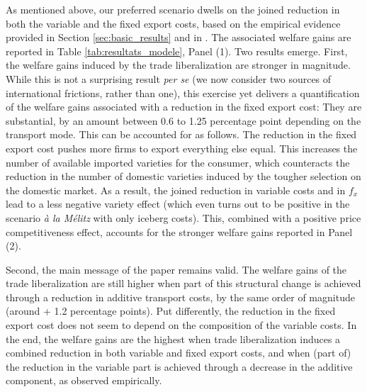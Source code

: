\documentclass[a4paper,11pt]{article}
\begin{document}
As mentioned above, our preferred scenario dwells on the joined reduction in both the variable and the fixed export costs, based on the empirical evidence provided in Section  \ref{sec:basic_results} and in \cite{Lincoln_McCallum2018}. The associated welfare gains are reported in Table \ref{tab:resultats_modele}, Panel (1). Two results emerge. First, the welfare gains induced by the trade liberalization are stronger in magnitude. While this is not a surprising result \textit{per se} (we now consider two sources of international frictions, rather than one), this exercise yet delivers a quantification of the welfare gains associated with a reduction in the fixed export cost: They are substantial, by an amount between 0.6 to 1.25 percentage point depending on the transport mode. This can be accounted for as follows. The reduction in the fixed export cost pushes more firms to export everything else equal. This increases the number of available imported varieties for the consumer, which counteracts the reduction in the number of domestic varieties induced by the tougher selection on the domestic market. As a result, the joined reduction in variable costs and in $f_x$ lead to a less negative variety effect (which even turns out to be positive in the scenario \textit{à la M\'{e}litz} with only iceberg costs). This, combined with a positive price competitiveness effect, accounts for the stronger welfare gains reported in Panel (2).

Second, the main message of the paper remains valid. The welfare gains of the trade liberalization are still higher when part of this structural change is achieved through a reduction in additive transport costs, by the same order of magnitude (around + 1.2 percentage points). Put differently, the reduction in the fixed export cost does not seem to depend on the composition of the variable costs. In the end, the welfare gains are the highest when trade liberalization induces a combined reduction in both variable and fixed export costs, and when (part of) the reduction in the variable part is achieved through a decrease in the additive component, as observed empirically.\smallskip
\end{document}
